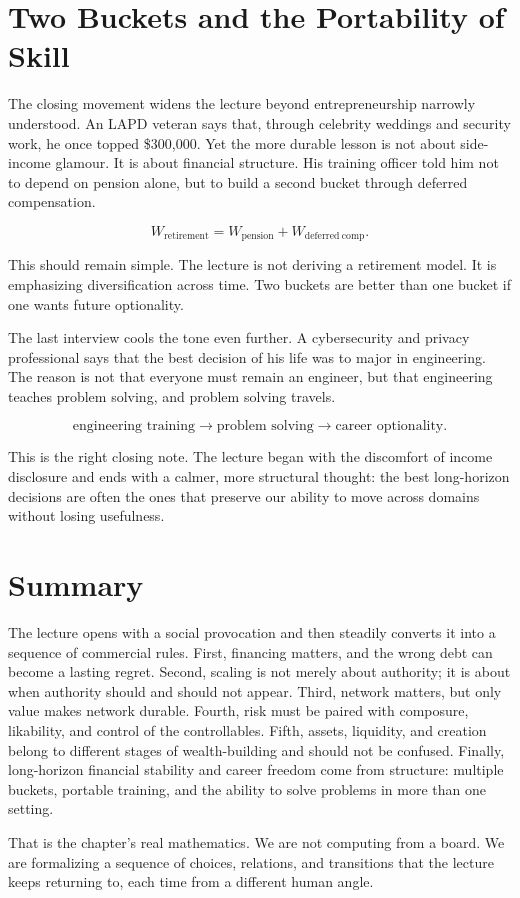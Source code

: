 \section{Two Buckets and the Portability of Skill}

The closing movement widens the lecture beyond entrepreneurship narrowly understood. An LAPD veteran says that, through celebrity weddings and security work, he once topped \$300{,}000. Yet the more durable lesson is not about side-income glamour. It is about financial structure. His training officer told him not to depend on pension alone, but to build a second bucket through deferred compensation.

\begin{equation}
W_{\mathrm{retirement}} = W_{\mathrm{pension}} + W_{\mathrm{deferred\ comp}}.
\end{equation}

This should remain simple. The lecture is not deriving a retirement model. It is emphasizing diversification across time. Two buckets are better than one bucket if one wants future optionality.

The last interview cools the tone even further. A cybersecurity and privacy professional says that the best decision of his life was to major in engineering. The reason is not that everyone must remain an engineer, but that engineering teaches problem solving, and problem solving travels.

\begin{equation}
\text{engineering training} \longrightarrow \text{problem solving} \longrightarrow \text{career optionality}.
\end{equation}

This is the right closing note. The lecture began with the discomfort of income disclosure and ends with a calmer, more structural thought: the best long-horizon decisions are often the ones that preserve our ability to move across domains without losing usefulness.

\section{Summary}

The lecture opens with a social provocation and then steadily converts it into a sequence of commercial rules. First, financing matters, and the wrong debt can become a lasting regret. Second, scaling is not merely about authority; it is about when authority should and should not appear. Third, network matters, but only value makes network durable. Fourth, risk must be paired with composure, likability, and control of the controllables. Fifth, assets, liquidity, and creation belong to different stages of wealth-building and should not be confused. Finally, long-horizon financial stability and career freedom come from structure: multiple buckets, portable training, and the ability to solve problems in more than one setting.

That is the chapter's real mathematics. We are not computing from a board. We are formalizing a sequence of choices, relations, and transitions that the lecture keeps returning to, each time from a different human angle.